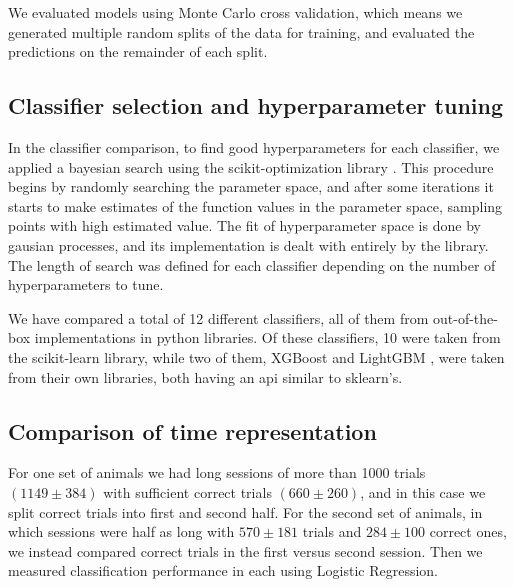     We evaluated models using Monte Carlo cross validation, which means we generated multiple random splits of the data for training, and evaluated the predictions on the remainder of each split. 

    \subsection{Classifier selection and hyperparameter tuning}
        In the classifier comparison, to find good hyperparameters for each classifier, we applied a bayesian search using the scikit-optimization library \cite{skopt}. This procedure begins by randomly searching the parameter space, and after some iterations it starts to make estimates of the function values in the parameter space, sampling points with high estimated value. The fit of hyperparameter space is done by gausian processes, and its implementation is dealt with entirely by the library. The length of search was defined for each classifier depending on the number of hyperparameters to tune.%
        
        We have compared a total of 12 different classifiers, all of them from out-of-the-box implementations in python libraries. Of these classifiers, 10 were taken from the scikit-learn \cite{scikit-learn} library, while two of them, XGBoost \cite{chen2016xgboost} and LightGBM \cite{ke2017lightgbm}, were taken from their own libraries, both having an api similar to sklearn's.

    \subsection{Comparison of time representation}
        For one set of animals we had long sessions of more than 1000 trials $(1149 \pm 384)$ with sufficient correct trials $(660 \pm 260)$, and in this case we split correct trials into first and second half. For the second set of animals, in which sessions were half as long with $570 \pm 181$ trials and $284\pm 100$ correct ones, we instead compared correct trials in the first versus second session. Then we measured classification performance in each using Logistic Regression. 
        
